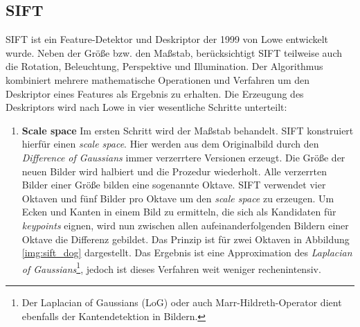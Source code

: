 \subsection{SIFT}

SIFT ist ein Feature-Detektor und Deskriptor der 1999 von Lowe \cite{dif2004} entwickelt wurde. Neben der Größe bzw. den Maßstab, berücksichtigt SIFT teilweise auch die Rotation, Beleuchtung, Perspektive und Illumination. Der Algorithmus kombiniert mehrere mathematische Operationen und Verfahren um den Deskriptor eines Features als Ergebnis zu erhalten. Die Erzeugung des Deskriptors wird nach Lowe in vier wesentliche Schritte unterteilt:

\begin{enumerate}
	\item \textbf{Scale space} Im ersten Schritt wird der Maßstab behandelt. SIFT konstruiert hierfür einen \textit{scale space}. Hier werden aus dem Originalbild durch den \textit{Difference of Gaussians} immer verzerrtere Versionen erzeugt. Die Größe der neuen Bilder wird halbiert und die Prozedur wiederholt. Alle verzerrten Bilder einer Größe bilden eine sogenannte Oktave. SIFT verwendet vier Oktaven und fünf Bilder pro Oktave um den \textit{scale space} zu erzeugen. Um Ecken und Kanten in einem Bild zu ermitteln, die sich als Kandidaten für \textit{keypoints} eignen, wird nun zwischen allen aufeinanderfolgenden Bildern einer Oktave die Differenz gebildet. Das Prinzip ist für zwei Oktaven in Abbildung \ref{img:sift_dog} dargestellt. Das Ergebnis ist eine Approximation des \textit{Laplacian of Gaussians}\footnote{Der Laplacian of Gaussians (LoG) oder auch Marr-Hildreth-Operator dient ebenfalls der Kantendetektion in Bildern.}, jedoch ist dieses Verfahren weit weniger rechenintensiv. 


\end{enumerate}
